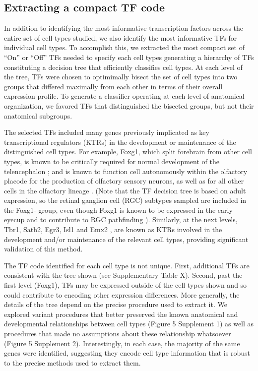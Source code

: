 \subsection{Extracting a compact TF code}
In addition to identifying the most informative transcription factors across the entire set of cell types studied, we also identify the most informative TFs for individual cell types. To accomplish this, we extracted the most compact set of “On” or “Off” TFs needed to specify each cell types generating a hierarchy of TFs constituting a decision tree \cite{Saeys_2007} that efficiently classifies cell types\cite{Gabitto_2016}. At each level of the tree, TFs were chosen to optimimally bisect the set of cell types into two groups that differed maximally from each other in terms of their overall expression profile. To generate a classifier operating at each level of anatomical organization, we favored TFs that distinguished the bisected groups, but not their anatomical subgroups.

The selected TFs included many genes previously implicated as key transcriptional regulators (KTRs) in the development or maintenance of the distinguished cell types. For example, Foxg1, which split forebrain from other cell types, is known to be critically required for normal development of the telencephalon \cite{Xuan_1995}; \cite{Danesin_2012} and is known to function cell autonomously within the olfactory placode for the production of olfactory sensory neurons, as well as for all other cells in the olfactory lineage \cite{Duggan_2008}. (Note that the TF decision tree is based on adult expression, so the retinal ganglion cell (RGC) subtypes sampled are included in the Foxg1- group, even though Foxg1 is known to be expressed in the early eyecup and to contribute to RGC pathfinding \cite{Schulte_2005}). Similarly, at the next levels,  Tbr1\cite{Bedogni_2010}, Satb2\cite{Sweeney_2017}, Egr3\cite{Chandra_2015}, Isl1\cite{Lu_2013} and Emx2 \cite{Zhang_2016}, are known as KTRs involved in the development and/or maintenance of the relevant cell types, providing significant validation of this method.

The TF code identified for each cell type is not unique. First, additional TFs are consistent with the tree shown (see Supplementary Table X). Second, past the first level (Foxg1), TFs may be expressed outside of the cell types shown and so could contribute to encoding other expression differences. More generally, the details of the tree depend on the precise procedure used to extract it. We explored variant procedures that better preserved the known anatomical and developmental relationships between cell types (Figure 5 Supplement 1) as well as procedures that made no assumptions about these relationship whatsoever (Figure 5 Supplement 2). Interestingly, in each case, the majority of the same genes were identified, suggesting they encode cell type information that is robust to the precise methods used to extract them.

